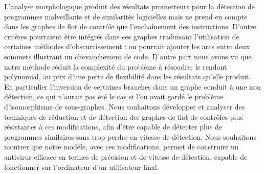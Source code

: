 L'analyse morphologique produit des résultats prometteurs pour la détection de programmes malveillants et de similarités logicielles mais ne prend en compte dans les graphes de flot de contrôle que l'enchaînement des instructions. D'autre critères pourraient être intégrés dans ces graphes traduisant l'utilisation de certaines méthodes d'obscurcissement : on pourrait ajouter les arcs entre deux sommets illustrant un chevauchement de code.
D'autre part nous avons vu que notre méthode réduit la complexité du problème à résoudre, le rendant polynomial, au prix d'une perte de flexibilité dans les résultats qu'elle produit.
En particulier l'inversion de certaines branches  dans un graphe conduit à une non détection, ce qui n'aurait pas été le cas si l'on avait gardé le problème d'isomorphisme de sous-graphes.
Nous souhaitons développer et analyser des techniques de réduction et de détection des graphes de flot de contrôles plus résistantes à ces modifications, afin d'être capable de détecter plus de programmes similaires sans trop perdre en vitesse de détection.
Nous souhaitons montrer que notre modèle, avec ces modifications, permet de construire un antivirus efficace en termes de précision et de vitesse de détection, capable de fonctionner sur l'ordinateur d'un utilisateur final.


